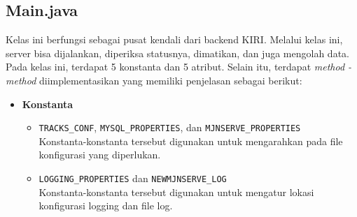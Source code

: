 \subsection{Main.java}
Kelas ini berfungsi sebagai pusat kendali dari backend KIRI. Melalui kelas ini, server bisa dijalankan, diperiksa statusnya, dimatikan, dan juga mengolah data. Pada kelas ini, terdapat 5 konstanta dan 5 atribut. Selain itu, terdapat \textit{method - method} diimplementasikan yang memiliki penjelasan sebagai berikut:
\begin{itemize}
    \item \textbf{Konstanta}
    \begin{itemize}
        \item \texttt{TRACKS\_CONF}, \texttt{MYSQL\_PROPERTIES}, dan \texttt{MJNSERVE\_PROPERTIES}
        \\ Konstanta-konstanta tersebut digunakan untuk mengarahkan pada file konfigurasi yang diperlukan.
        \item \texttt{LOGGING\_PROPERTIES} dan \texttt{NEWMJNSERVE\_LOG}
        \\ Konstanta-konstanta tersebut digunakan untuk mengatur lokasi konfigurasi logging dan file log.
    \end{itemize}


\end{itemize}
